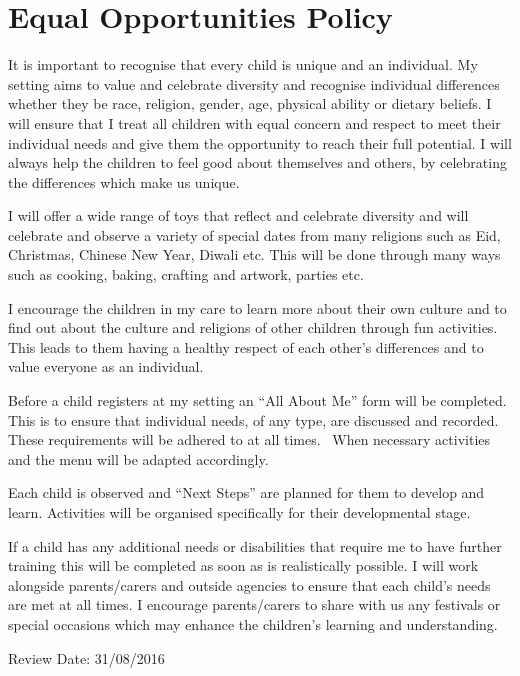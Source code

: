 

\section{Equal Opportunities Policy}

It is important to recognise that every child is unique and an
individual. My setting aims to value and celebrate diversity and
recognise individual differences whether they be race, religion, gender,
age, physical ability or dietary beliefs. I will ensure that I treat all
children with equal concern and respect to meet their individual needs
and give them the opportunity to reach their full potential. I will
always help the children to feel good about themselves and others, by
celebrating the differences which make us unique.

I will offer a wide range of toys that reflect and celebrate diversity
and will celebrate and observe a variety of special dates from many
religions such as Eid, Christmas, Chinese New Year, Diwali etc. This
will be done through many ways such as cooking, baking, crafting and
artwork, parties etc.

I encourage the children in my care to learn more about their own
culture and to find out about the culture and religions of other
children through fun activities. This leads to them having a healthy
respect of each other's differences and to value everyone as an
individual.

Before a child registers at my setting an ``All About Me'' form will be
completed. This is to ensure that individual needs, of any type, are
discussed and recorded. These requirements will be adhered to at all
times. ~When necessary activities and the menu will be adapted
accordingly.

Each child is observed and ``Next Steps'' are planned for them to
develop and learn. Activities will be organised specifically for their
developmental stage.

If a child has any additional needs or disabilities that require me to
have further training this will be completed as soon as is realistically
possible. I will work alongside parents/carers and outside agencies to
ensure that each child's needs are met at all times. I encourage
parents/carers to share with us any festivals or special occasions which
may enhance the children's learning and understanding.

Review Date: 31/08/2016



